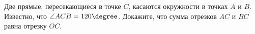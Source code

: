 \begin{ex}
	\begin{condition}
		Две прямые, пересекающиеся в точке \( C \), касаются окружности в точках \( A  \) и \( B \). Известно, что \( \angle ACB = 120\degree \). Докажите, что сумма отрезков \( AC  \) и \( BC  \) равна отрезку \( OC \).
	\end{condition}
\end{ex}
